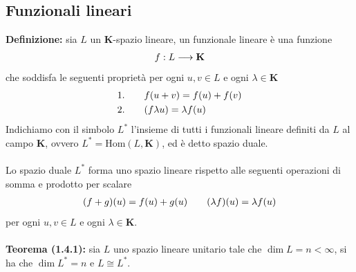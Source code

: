 \documentclass{article}
\begin{document}
\subsection{Funzionali lineari}
\textbf{Definizione:} sia $L$ un $\mathbf{K}$-spazio lineare, un funzionale lineare è una funzione
\begin{gather}
    f : L \longrightarrow \mathbf{K} \notag
\end{gather}
che soddisfa le seguenti proprietà per ogni $u, v \in L$ e ogni $\lambda \in \mathbf{K}$
\begin{align}
    1. \qquad &f(u + v) = f(u) + f(v) \notag \\
    2. \qquad &(f\lambda u) = \lambda f(u) \notag
\end{align}
Indichiamo con il simbolo $L^*$ l'insieme di tutti i funzionali lineare definiti da $L$ al campo $\mathbf{K}$, ovvero $L^* = \mathrm{Hom}(L, \mathbf{K})$, ed è detto spazio duale. \\ \\
Lo spazio duale $L^*$ forma uno spazio lineare rispetto alle seguenti operazioni di somma e prodotto per scalare
\begin{align}
    (f + g)(u) = f(u) + g(u) \qquad (\lambda f)(u) = \lambda f(u) \notag
\end{align}
per ogni $u, v \in L$ e ogni $\lambda \in \mathbf{K}$. \\ \\
\textbf{Teorema (1.4.1):} sia $L$ uno spazio lineare unitario tale che $\dim L = n < \infty$, si ha che $\dim L^* = n$ e $L \cong L^*$. \\
\end{document}
